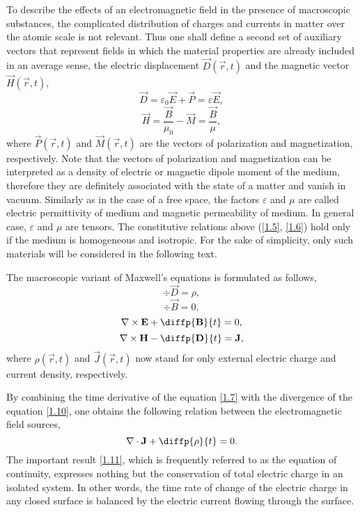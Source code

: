 To describe the effects of an electromagnetic field in the presence of macroscopic substances, the complicated distribution of charges and currents in matter over the atomic scale is not relevant. Thus one shall define a second set of auxiliary vectors that represent fields in which the material properties are already included in an average sense, the electric displacement $ \vec{D}\left( \vec{r}, t \right) $ and the magnetic vector $ \vec{H}\left( \vec{r}, t \right) $,
\begin{equation}
\label{1.5}
\vec{D} = \varepsilon_0 \vec{E} + \vec{P} = \varepsilon \vec{E},
\end{equation}
\begin{equation}
\label{1.6}
\vec{H} = \frac{\vec{B}}{\mu_0} - \vec{M} = \frac{\vec{B}}{\mu},
\end{equation}
where $ \vec{P}\left( \vec{r}, t \right) $ and $ \vec{M}\left( \vec{r}, t \right) $ are the vectors of polarization and magnetization, respectively. Note that the vectors of polarization and magnetization can be interpreted as a density of electric or magnetic dipole moment of the medium, therefore they are definitely associated with the state of a matter and vanish in vacuum. Similarly as in the case of a free space, the factors $ \varepsilon $ and $ \mu $ are called electric permittivity of medium and magnetic permeability of medium. In general case, $ \varepsilon $ and $ \mu $ are tensors. The constitutive relations above (\ref{1.5}, \ref{1.6}) hold only if the medium is homogeneous and isotropic. For the sake of simplicity, only such materials will be considered in the following text.

The macroscopic variant of Maxwell's equations is formulated as follows,
\begin{equation}
\label{1.7}
\div{\vec{D}} = \rho,
\end{equation}
\begin{equation}
\label{1.8}
\div{\vec{B}} = 0,
\end{equation}
\begin{equation}
\label{1.9}
\rot{\vec{E}} + \diffp{\vec{B}}{t} = 0,
\end{equation}
\begin{equation}
\label{1.10}
\rot{\vec{H}} - \diffp{\vec{D}}{t} = \vec{J},
\end{equation}
where $ \rho\left(\vec{r}, t \right) $ and $ \vec{J}\left(\vec{r}, t \right) $ now stand for only external electric charge and current density, respectively.

By combining the time derivative of the equation \ref{1.7} with the divergence of the equation \ref{1.10}, one obtains the following relation between the electromagnetic field sources,
\begin{equation}
\label{1.11}
\div{\vec{J}} + \diffp{\rho}{t} = 0.
\end{equation}
The important result \ref{1.11}, which is frequently referred to as the equation of continuity, expresses nothing but the conservation of total electric charge in an isolated system. In other words, the time rate of change of the electric charge in any closed surface is balanced by the electric current flowing through the surface.


